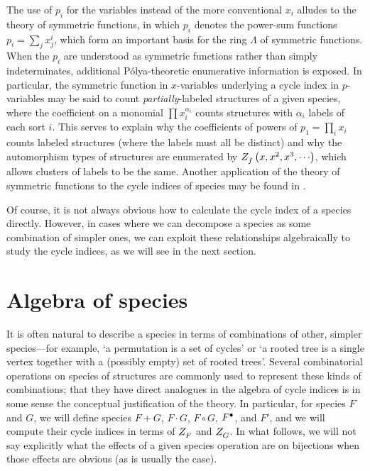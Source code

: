 \documentclass[distribution,draft]{brandiss} %
\numberwithin{section}{chapter}
\numberwithin{figure}{chapter}
\begin{document}
The use of $p_{i}$ for the variables instead of the more conventional $x_{i}$ alludes to the theory of symmetric functions, in which $p_{i}$ denotes the power-sum functions $p_{i} = \sum_{j} x_{j}^{i}$, which form an important basis for the ring $\Lambda$ of symmetric functions.
When the $p_{i}$ are understood as symmetric functions rather than simply indeterminates, additional P\'{o}lya-theoretic enumerative information is exposed.
In particular, the symmetric function in $x$-variables underlying a cycle index in $p$-variables may be said to count \emph{partially}-labeled structures of a given species, where the coefficient on a monomial $\prod x_{i}^{\alpha_{i}}$ counts structures with $\alpha_{i}$ labels of each sort $i$.
This serves to explain why the coefficients of powers of $p_{1} = \prod_{i} x_{i}$ counts labeled structures (where the labels must all be distinct) and why the automorphism types of structures are enumerated by $ Z_{f}^{} \left( {x, x^{2}, x^{3}, \cdots} \right) $, which allows clusters of labels to be the same.
Another application of the theory of symmetric functions to the cycle indices of species may be found in \cite{gessel:laginvspec}.

Of course, it is not always obvious how to calculate the cycle index of a species directly.
However, in cases where we can decompose a species as some combination of simpler ones, we can exploit these relationships algebraically to study the cycle indices, as we will see in the next section.

\section{Algebra of species}\label{s:specalg}
It is often natural to describe a species in terms of combinations of other, simpler species---for example, `a permutation is a set of cycles' or `a rooted tree is a single vertex together with a (possibly empty) set of rooted trees'.
Several combinatorial operations on species of structures are commonly used to represent these kinds of combinations; that they have direct analogues in the algebra of cycle indices is in some sense the conceptual justification of the theory.
In particular, for species $F$ and $G$, we will define species $F + G$, $F \cdot G$, $F \circ G$, $ {F}^{\bullet } $, and $F'$, and we will compute their cycle indices in terms of $ Z_{F}^{} $ and $ Z_{G}^{} $.
In what follows, we will not say explicitly what the effects of a given species operation are on bijections when those effects are obvious (as is usually the case).
\end{document}
